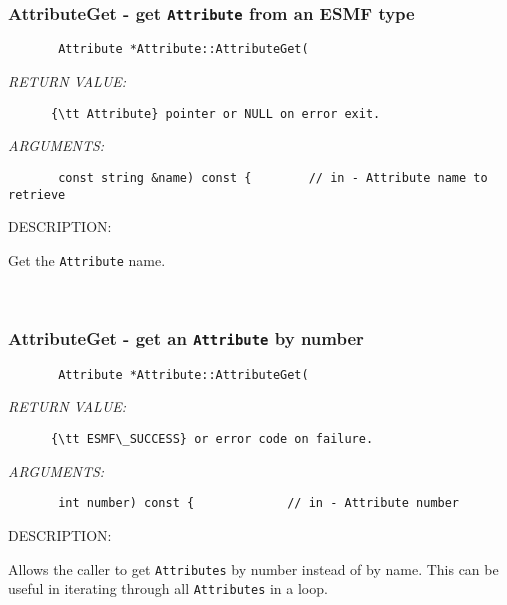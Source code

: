 \mbox{}\hrulefill\
 
\subsubsection [AttributeGet] {AttributeGet - get {\tt Attribute} from an ESMF type}


  
\begin{verbatim}       Attribute *Attribute::AttributeGet(\end{verbatim}{\em RETURN VALUE:}
\begin{verbatim}      {\tt Attribute} pointer or NULL on error exit.\end{verbatim}{\em ARGUMENTS:}
\begin{verbatim}       const string &name) const {        // in - Attribute name to retrieve\end{verbatim}
{\sf DESCRIPTION:\\ }


      Get the {\tt Attribute} name.
   
 
\mbox{}\hrulefill\
 
\subsubsection [AttributeGet] {AttributeGet - get an {\tt Attribute} by number}


  
\begin{verbatim}       Attribute *Attribute::AttributeGet(\end{verbatim}{\em RETURN VALUE:}
\begin{verbatim}      {\tt ESMF\_SUCCESS} or error code on failure.\end{verbatim}{\em ARGUMENTS:}
\begin{verbatim}       int number) const {             // in - Attribute number\end{verbatim}
{\sf DESCRIPTION:\\ }


       Allows the caller to get {\tt Attributes} by number instead of by name.
       This can be useful in iterating through all {\tt Attributes} in a loop.
   
 
\mbox{}\hrulefill\
 
